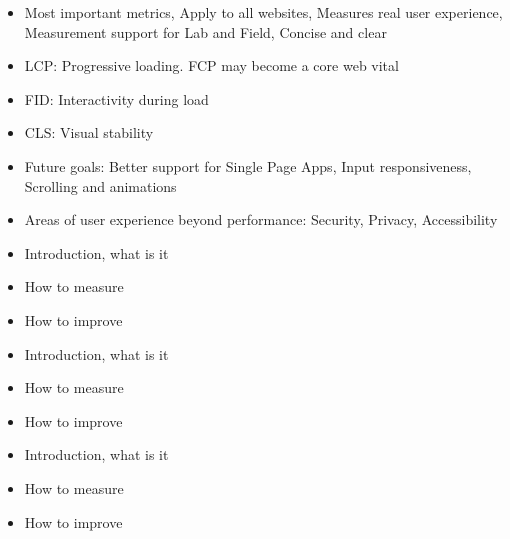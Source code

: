 \begin{itemize}
\item Most important metrics, Apply to all websites, Measures real user experience, Measurement support for Lab and Field, Concise and clear
\item LCP: Progressive loading. FCP may become a core web vital
\item FID: Interactivity during load
\item CLS: Visual stability
\item Future goals: Better support for Single Page Apps, Input responsiveness, Scrolling and animations
\item Areas of user experience beyond performance: Security, Privacy, Accessibility
\end{itemize}

\begin{itemize}
\item Introduction, what is it
\item How to measure
\item How to improve
\end{itemize}

\begin{itemize}
\item Introduction, what is it
\item How to measure
\item How to improve
\end{itemize}

\begin{itemize}
\item Introduction, what is it
\item How to measure
\item How to improve
\end{itemize}







